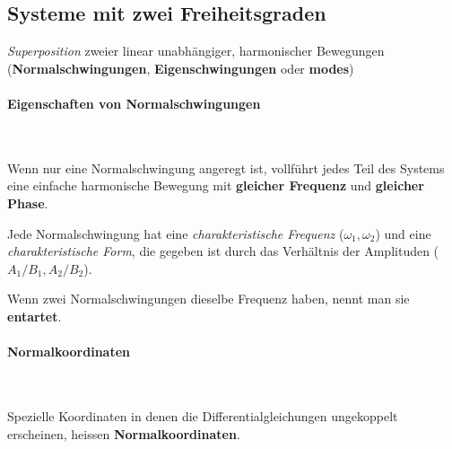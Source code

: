	\subsection{Systeme mit zwei Freiheitsgraden} %
		\emph{Superposition} zweier linear unabhängiger, harmonischer Bewegungen
		(\textbf{Normalschwingungen}, \textbf{Eigenschwingungen} oder \textbf{modes})
		
		\paragraph{Eigenschaften von Normalschwingungen} %
			~
			
			Wenn nur eine Normalschwingung angeregt ist, vollführt jedes Teil des
			Systems eine einfache harmonische Bewegung mit \textbf{gleicher Frequenz}
			und \textbf{gleicher Phase}.
			
			Jede Normalschwingung hat eine \emph{charakteristische Frequenz}
			($\omega_1, \omega_2$) und eine \emph{charakteristische Form}, die gegeben
			ist durch das Verhältnis der Amplituden ($A_1/B_1, A_2/B_2$).
			
			Wenn zwei Normalschwingungen dieselbe Frequenz haben, nennt man sie
			\textbf{entartet}.
		
		\paragraph{Normalkoordinaten} %
			~
			
			Spezielle Koordinaten in denen die Differentialgleichungen ungekoppelt
			erscheinen, heissen \textbf{Normalkoordinaten}.

